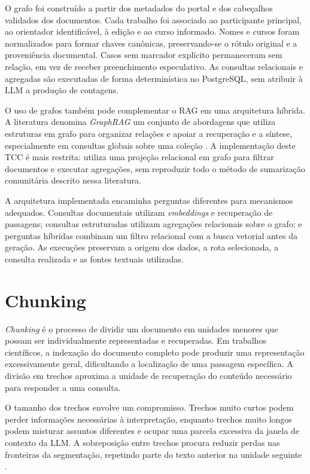 O grafo foi construído a partir dos metadados do portal e dos cabeçalhos validados dos documentos. Cada trabalho foi associado ao participante principal, ao orientador identificável, à edição e ao curso informado. Nomes e cursos foram normalizados para formar chaves canônicas, preservando-se o rótulo original e a proveniência documental. Casos sem marcador explícito permaneceram sem relação, em vez de receber preenchimento especulativo. As consultas relacionais e agregadas são executadas de forma determinística no PostgreSQL, sem atribuir à LLM a produção de contagens.

O uso de grafos também pode complementar o RAG em uma arquitetura híbrida. A literatura denomina \textit{GraphRAG} um conjunto de abordagens que utiliza estruturas em grafo para organizar relações e apoiar a recuperação e a síntese, especialmente em consultas globais sobre uma coleção \cite{edge2024graphrag}. A implementação deste TCC é mais restrita: utiliza uma projeção relacional em grafo para filtrar documentos e executar agregações, sem reproduzir todo o método de sumarização comunitária descrito nessa literatura.

A arquitetura implementada encaminha perguntas diferentes para mecanismos adequados. Consultas documentais utilizam \textit{embeddings} e recuperação de passagens; consultas estruturadas utilizam agregações relacionais sobre o grafo; e perguntas híbridas combinam um filtro relacional com a busca vetorial antes da geração. As execuções preservam a origem dos dados, a rota selecionada, a consulta realizada e as fontes textuais utilizadas.

\section{Chunking}

\textit{Chunking} é o processo de dividir um documento em unidades menores que possam ser individualmente representadas e recuperadas. Em trabalhos científicos, a indexação do documento completo pode produzir uma representação excessivamente geral, dificultando a localização de uma passagem específica. A divisão em trechos aproxima a unidade de recuperação do conteúdo necessário para responder a uma consulta.

O tamanho dos trechos envolve um compromisso. Trechos muito curtos podem perder informações necessárias à interpretação, enquanto trechos muito longos podem misturar assuntos diferentes e ocupar uma parcela excessiva da janela de contexto da LLM. A sobreposição entre trechos procura reduzir perdas nas fronteiras da segmentação, repetindo parte do texto anterior na unidade seguinte \cite{gao2024survey}.

